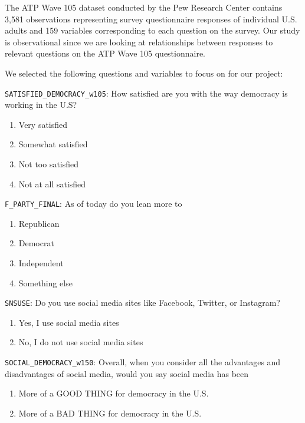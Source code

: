 \documentclass[
]{article}
\begin{document}
The ATP Wave 105 dataset conducted by the Pew Research Center contains
3,581 observations representing survey questionnaire responses of
individual U.S. adults and 159 variables corresponding to each question
on the survey. Our study is observational since we are looking at
relationships between responses to relevant questions on the ATP Wave
105 questionnaire.

We selected the following questions and variables to focus on for our
project:

\texttt{SATISFIED\_DEMOCRACY\_w105}: How satisfied are you with the way
democracy is working in the U.S?

\begin{enumerate}
\def\labelenumi{\arabic{enumi})}
\item
  Very satisfied
\item
  Somewhat satisfied
\item
  Not too satisfied
\item
  Not at all satisfied
\end{enumerate}

\texttt{F\_PARTY\_FINAL}: As of today do you lean more to

\begin{enumerate}
\def\labelenumi{\arabic{enumi})}
\item
  Republican
\item
  Democrat
\item
  Independent
\item
  Something else
\end{enumerate}

\texttt{SNSUSE}: Do you use social media sites like Facebook, Twitter,
or Instagram?

\begin{enumerate}
\def\labelenumi{\arabic{enumi})}
\item
  Yes, I use social media sites
\item
  No, I do not use social media sites
\end{enumerate}

\texttt{SOCIAL\_DEMOCRACY\_w150}: Overall, when you consider all the
advantages and disadvantages of social media, would you say social media
has been

\begin{enumerate}
\def\labelenumi{\arabic{enumi})}
\item
  More of a GOOD THING for democracy in the U.S.
\item
  More of a BAD THING for democracy in the U.S.
\end{enumerate}
\end{document}
